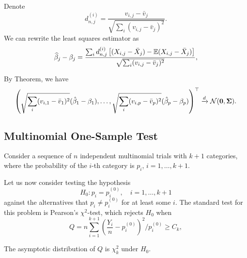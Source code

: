Denote
\begin{equation*}
	d_{n,j}^{(i)}=\frac{v_{i,j}-\bar{v}_{j}}{\sqrt{\sum_{i}(v_{i,j}-\bar{v}_{j})^{2}}}.
\end{equation*}
We can rewrite the least squares estimator as
\begin{equation*}
	\widehat{\beta}_{j}-\beta_{j}=\frac{\sum_{i}d_{n,j}^{(i)}\left[(X_{i,j}-\bar{X}_{j})-\mathbb{E}(X_{i,j}-\bar{X}_{j})\right]}{\sqrt{\sum_{i}(v_{i,j}-\bar{v}_{j})^{2}}},
\end{equation*}

By Theorem, we have
\begin{equation*}
	\left(\sqrt{\sum_{i}(v_{i,1}-\bar{v}_{1})^{2}}(\hat{\beta}_{1}-\beta_{1}),\ldots,\sqrt{\sum_{i}(v_{i,p}-\bar{v}_{p})^{2}}(\hat{\beta}_{p}-\beta_{p})\right)^{\top}\xrightarrow{d}\mathcal{N}(\mathbf{0},\boldsymbol{\Sigma}).
\end{equation*}

\subsection{Multinomial One-Sample Test}

Consider a sequence of \(n\) independent multinomial trials with \(k+1\) categories, where the probability of the \(i\)-th category is \(p_{i}\), \(i=1,\ldots,k+1\).

Let us now consider testing the hypothesis
\begin{equation*}
	H_{0}:p_i=p_i^{(0)},\quad i=1,\ldots,k+1
\end{equation*}
against the alternatives that \(p_{i}\neq p_{i}^{(0)}\) for at least some \(i\). The standard test for this problem is Pearson's \(\chi^2\)-test, which rejects \(H_{0}\) when
\begin{equation*}
	Q=n\sum_{i=1}^{k+1}\left(\frac{Y_i}{n}-p_i^{(0)}\right)^2/p_i^{(0)}\geq C_k,
\end{equation*}

The asymptotic distribution of \(Q\) is \(\chi^{2}_{k}\) under \(H_{0}\).

